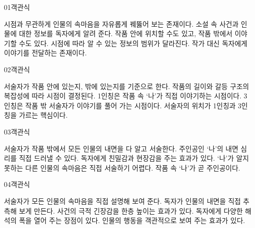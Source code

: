 \documentclass[fs9,seriesRus]{korfarm-base}
\begin{document}

\par\medskip
\kfBeginMC
\begin{kfQBlock}{01}{객관식}
\begin{kfChoices}
\kfChoice 시점과 무관하게 인물의 속마음을 자유롭게 꿰뚫어 보는 존재이다.
\kfChoice 소설 속 사건과 인물에 대한 정보를 독자에게 알려 준다.
\kfChoice 작품 안에 위치할 수도 있고, 작품 밖에서 이야기할 수도 있다.
\kfChoice 시점에 따라 알 수 있는 정보의 범위가 달라진다.
\kfChoice 작가 대신 독자에게 이야기를 전달하는 존재이다.
\end{kfChoices}
\end{kfQBlock}
\begin{kfQBlock}{02}{객관식}
\begin{kfChoices}
\kfChoice 서술자가 작품 안에 있는지, 밖에 있는지를 기준으로 한다.
\kfChoice 작품의 길이와 갈등 구조의 복잡성에 따라 시점이 결정된다.
\kfChoice 1인칭은 작품 속 ‘나’가 직접 이야기하는 시점이다.
\kfChoice 3인칭은 작품 밖 서술자가 이야기를 풀어 가는 시점이다.
\kfChoice 서술자의 위치가 1인칭과 3인칭을 가르는 핵심이다.
\end{kfChoices}
\end{kfQBlock}
\begin{kfQBlock}{03}{객관식}
\begin{kfChoices}
\kfChoice 서술자가 작품 밖에서 모든 인물의 내면을 다 알고 서술한다.
\kfChoice 주인공인 ‘나’의 내면 심리를 직접 드러낼 수 있다.
\kfChoice 독자에게 친밀감과 현장감을 주는 효과가 있다.
\kfChoice ‘나’가 알지 못하는 다른 인물의 속마음은 직접 서술하기 어렵다.
\kfChoice 작품 속 ‘나’가 곧 주인공이다.
\end{kfChoices}
\end{kfQBlock}
\begin{kfQBlock}{04}{객관식}
\begin{kfChoices}
\kfChoice 서술자가 모든 인물의 속마음을 직접 설명해 보여 준다.
\kfChoice 독자가 인물의 내면을 직접 추측해 보게 만든다.
\kfChoice 사건의 극적 긴장감을 한층 높이는 효과가 있다.
\kfChoice 독자에게 다양한 해석의 폭을 열어 주는 장점이 있다.
\kfChoice 인물의 행동을 객관적으로 보여 주는 효과가 있다.
\end{kfChoices}
\end{kfQBlock}
\end{document}
